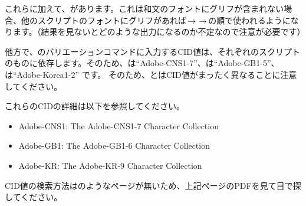 \documentclass[../otf-unofficial-guide]{subfiles}
\begin{document}
これらに加えて、があります。これは和文のフォントにグリフが含まれない場合、他のスクリプトのフォントにグリフがあれば{\fantizi}\,→\,{\jiantizi}\,→\,{\hankgo}の順で使われるようになります。（結果を見ないとどのような出力になるのか不定なので注意が必要です）


他方で、のバリエーションコマンドに入力するCID値は、それぞれのスクリプトのものに依存します。そのため、{\fantizi}は``{\ptmfamily Adobe-CNS1-7}''、{\jiantizi}は``{\ptmfamily Adobe-GB1-5}''、{\hankgo}は``{\ptmfamily Adobe-Korea1-2}'' 
です。
そのため、{\AdobeJapan}とはCID値がまったく異なることに注意してください。

これらのCIDの詳細は以下を参照してください。

\begin{itemize}
  \item Adobe-CNS1: The Adobe-CNS1-7 Character Collection
    \\
  \item Adobe-GB1: The Adobe-GB1-6 Character Collection
    \\
  \item Adobe-KR: The Adobe-KR-9 Character Collection
    \\
\end{itemize}

CID値の検索方法は{\AdobeJapan}のようなページが無いため、上記ページのPDFを見て目で探してください。
\end{document}
